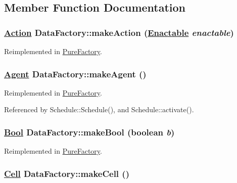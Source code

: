\subsection{Member Function Documentation}
\hypertarget{interfaceDataFactory_a8}{
\subsubsection[makeAction]{\setlength{\rightskip}{0pt plus 5cm}\hyperlink{interfaceAction}{Action} Data\-Factory::make\-Action (\hyperlink{interfaceEnactable}{Enactable} {\em enactable})}}
\label{interfaceDataFactory_a8}




Reimplemented in \hyperlink{classPureFactory_a12}{Pure\-Factory}.\hypertarget{interfaceDataFactory_a10}{
\subsubsection[makeAgent]{\setlength{\rightskip}{0pt plus 5cm}\hyperlink{interfaceAgent}{Agent} Data\-Factory::make\-Agent ()}}
\label{interfaceDataFactory_a10}




Reimplemented in \hyperlink{classPureFactory_a8}{Pure\-Factory}.

Referenced by Schedule::Schedule(), and Schedule::activate().

\hypertarget{interfaceDataFactory_a4}{
\subsubsection[makeBool]{\setlength{\rightskip}{0pt plus 5cm}\hyperlink{interfaceBool}{Bool} Data\-Factory::make\-Bool (boolean {\em b})}}
\label{interfaceDataFactory_a4}




Reimplemented in \hyperlink{classPureFactory_a3}{Pure\-Factory}.\hypertarget{interfaceDataFactory_a11}{
\subsubsection[makeCell]{\setlength{\rightskip}{0pt plus 5cm}\hyperlink{interfaceCell}{Cell} Data\-Factory::make\-Cell ()}}
\label{interfaceDataFactory_a11}





